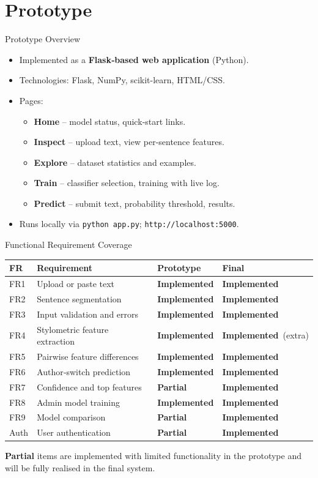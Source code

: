 \documentclass[compress,aspectratio=169]{beamer}
\newcommand{\Done}   {\textcolor{statusdone}{\textbf{Implemented}}}
\newcommand{\Partial}{\textcolor{statuspart}{\textbf{Partial}}}
\begin{document}
\section{Prototype}
\begin{frame}{Prototype Overview}
    \begin{itemize}
        \item Implemented as a \textbf{Flask‑based web application} (Python).
        \item Technologies: Flask, NumPy, scikit-learn, HTML/CSS.
        \item Pages:
        \begin{itemize}
            \item \textbf{Home} – model status, quick‑start links.
            \item \textbf{Inspect} – upload text, view per‑sentence features.
            \item \textbf{Explore} – dataset statistics and examples.
            \item \textbf{Train} – classifier selection, training with live log.
            \item \textbf{Predict} – submit text, probability threshold, results.
        \end{itemize}
        \item Runs locally via \texttt{python app.py}; \texttt{http://localhost:5000}.
    \end{itemize}
\end{frame}

\begin{frame}{Functional Requirement Coverage}
    \centering
    \small
    \begin{tabular}{p{0.7cm} p{5.5cm} p{2.0cm} p{2.0cm}}
    \toprule
    \textbf{FR} & \textbf{Requirement} & \textbf{Prototype} & \textbf{Final}\\
    \midrule
    FR1  & Upload or paste text          & \Done   & \Done\\
    FR2  & Sentence segmentation         & \Done   & \Done\\
    FR3  & Input validation and errors   & \Done   & \Done\\
    FR4  & Stylometric feature extraction& \Done   & \Done\ (extra)\\
    FR5  & Pairwise feature differences  & \Done   & \Done\\
    FR6  & Author‑switch prediction      & \Done   & \Done\\
    FR7  & Confidence and top features   & \Partial& \Done\\
    FR8  & Admin model training          & \Done   & \Done\\
    FR9  & Model comparison              & \Partial& \Done\\
    Auth & User authentication           & \Partial& \Done\\
    \bottomrule
    \end{tabular}
    \vspace{0.3cm}
    
    \footnotesize\raggedright
    \textbf{Partial} items are implemented with limited functionality in the prototype and will be fully realised in the final system.
\end{frame}
\end{document}
